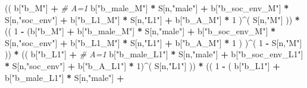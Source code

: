 \documentclass[
]{book}
\newenvironment{Shaded}{\begin{snugshade}}{\end{snugshade}}
\newcommand{\CommentTok}[1]{\textcolor[rgb]{0.56,0.35,0.01}{\textit{#1}}}
\newcommand{\DecValTok}[1]{\textcolor[rgb]{0.00,0.00,0.81}{#1}}
\newcommand{\NormalTok}[1]{#1}
\newcommand{\SpecialCharTok}[1]{\textcolor[rgb]{0.81,0.36,0.00}{\textbf{#1}}}
\newcommand{\StringTok}[1]{\textcolor[rgb]{0.31,0.60,0.02}{#1}}
\begin{document}
\begin{Shaded}
\begin{Highlighting}[]
\NormalTok{      (( b[}\StringTok{"b\_M"}\NormalTok{] }\SpecialCharTok{+}                                                             \CommentTok{\# A\textquotesingle{}=1}
\NormalTok{           b[}\StringTok{"b\_male\_M"}\NormalTok{] }\SpecialCharTok{*}\NormalTok{ S[n,}\StringTok{"male"}\NormalTok{] }\SpecialCharTok{+} 
\NormalTok{           b[}\StringTok{"b\_soc\_env\_M"}\NormalTok{] }\SpecialCharTok{*}\NormalTok{ S[n,}\StringTok{"soc\_env"}\NormalTok{] }\SpecialCharTok{+} 
\NormalTok{           b[}\StringTok{"b\_L1\_M"}\NormalTok{] }\SpecialCharTok{*}\NormalTok{ S[n,}\StringTok{"L1"}\NormalTok{] }\SpecialCharTok{+}
\NormalTok{           b[}\StringTok{"b\_A\_M"}\NormalTok{] }\SpecialCharTok{*} \DecValTok{1}\NormalTok{ )}\SpecialCharTok{\^{}}\NormalTok{( S[n,}\StringTok{"M"}\NormalTok{] )) }\SpecialCharTok{*}
\NormalTok{      (( }\DecValTok{1} \SpecialCharTok{{-}}\NormalTok{ (b[}\StringTok{"b\_M"}\NormalTok{] }\SpecialCharTok{+} 
\NormalTok{                b[}\StringTok{"b\_male\_M"}\NormalTok{] }\SpecialCharTok{*}\NormalTok{ S[n,}\StringTok{"male"}\NormalTok{] }\SpecialCharTok{+} 
\NormalTok{                b[}\StringTok{"b\_soc\_env\_M"}\NormalTok{] }\SpecialCharTok{*}\NormalTok{ S[n,}\StringTok{"soc\_env"}\NormalTok{] }\SpecialCharTok{+} 
\NormalTok{                b[}\StringTok{"b\_L1\_M"}\NormalTok{] }\SpecialCharTok{*}\NormalTok{ S[n,}\StringTok{"L1"}\NormalTok{] }\SpecialCharTok{+}
\NormalTok{                b[}\StringTok{"b\_A\_M"}\NormalTok{] }\SpecialCharTok{*} \DecValTok{1}\NormalTok{ ) )}\SpecialCharTok{\^{}}\NormalTok{( }\DecValTok{1} \SpecialCharTok{{-}}\NormalTok{ S[n,}\StringTok{"M"}\NormalTok{] )) }\SpecialCharTok{*}
\NormalTok{      (( b[}\StringTok{"b\_L1"}\NormalTok{] }\SpecialCharTok{+}                                                            \CommentTok{\# A=1}
\NormalTok{           b[}\StringTok{"b\_male\_L1"}\NormalTok{] }\SpecialCharTok{*}\NormalTok{ S[n,}\StringTok{"male"}\NormalTok{] }\SpecialCharTok{+}  
\NormalTok{           b[}\StringTok{"b\_soc\_env\_L1"}\NormalTok{] }\SpecialCharTok{*}\NormalTok{ S[n,}\StringTok{"soc\_env"}\NormalTok{] }\SpecialCharTok{+}
\NormalTok{           b[}\StringTok{"b\_A\_L1"}\NormalTok{] }\SpecialCharTok{*} \DecValTok{1}\NormalTok{)}\SpecialCharTok{\^{}}\NormalTok{( S[n,}\StringTok{"L1"}\NormalTok{] )) }\SpecialCharTok{*}
\NormalTok{      (( }\DecValTok{1} \SpecialCharTok{{-}}\NormalTok{ ( b[}\StringTok{"b\_L1"}\NormalTok{] }\SpecialCharTok{+}
\NormalTok{                 b[}\StringTok{"b\_male\_L1"}\NormalTok{] }\SpecialCharTok{*}\NormalTok{ S[n,}\StringTok{"male"}\NormalTok{] }\SpecialCharTok{+}  

\end{Highlighting}
\end{Shaded}
\end{document}

